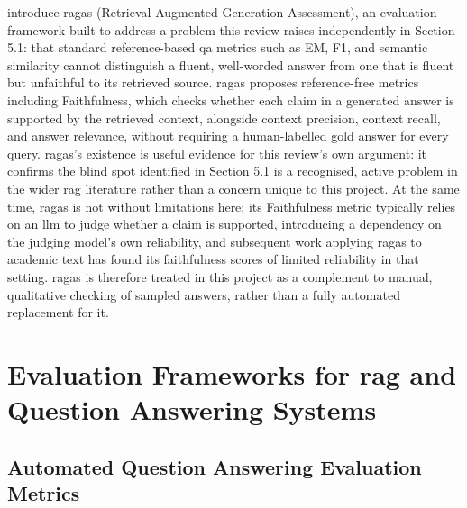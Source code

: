 \citet{es2024ragas} introduce \gls{ragas} (Retrieval Augmented Generation Assessment), an evaluation framework built to address a problem this review raises independently in Section 5.1: that standard reference-based \gls{qa} metrics such as EM, F1, and semantic similarity cannot distinguish a fluent, well-worded answer from one that is fluent but unfaithful to its retrieved source. \gls{ragas} proposes reference-free metrics including Faithfulness, which checks whether each claim in a generated answer is supported by the retrieved context, alongside context precision, context recall, and answer relevance, without requiring a human-labelled gold answer for every query.
\newline \newline \gls{ragas}'s existence is useful evidence for this review's own argument: it confirms the blind spot identified in Section 5.1 is a recognised, active problem in the wider \gls{rag} literature rather than a concern unique to this project. At the same time, \gls{ragas} is not without limitations here; its Faithfulness metric typically relies on an \gls{llm} to judge whether a claim is supported, introducing a dependency on the judging model's own reliability, and subsequent work applying \gls{ragas} to academic text has found its faithfulness scores of limited reliability in that setting. \gls{ragas} is therefore treated in this project as a complement to manual, qualitative checking of sampled answers, rather than a fully automated replacement for it.

\section{Evaluation Frameworks for \gls{rag} and Question Answering Systems}

\subsection{Automated Question Answering Evaluation Metrics}

